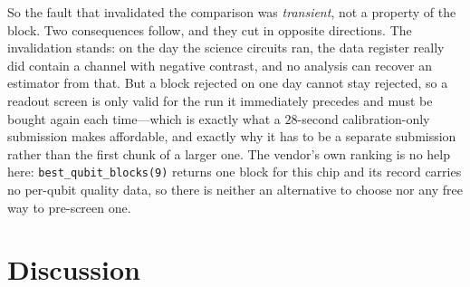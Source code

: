 \documentclass[aps,prxquantum,reprint,superscriptaddress]{revtex4-2}
\begin{document}
So the fault that invalidated the comparison was \emph{transient}, not a property
of the block. Two consequences follow, and they cut in opposite directions. The
invalidation stands: on the day the science circuits ran, the data register really
did contain a channel with negative contrast, and no analysis can recover an
estimator from that. But a block rejected on one day cannot stay rejected, so a
readout screen is only valid for the run it immediately precedes and must be
bought again each time---which is exactly what a $28$-second calibration-only
submission makes affordable, and exactly why it has to be a separate submission
rather than the first chunk of a larger one. The vendor's own ranking is no help
here: \texttt{best\_qubit\_blocks(9)} returns one block for this chip and its
record carries no per-qubit quality data, so there is neither an alternative to
choose nor any free way to pre-screen one.

\section*{Discussion}
\end{document}
